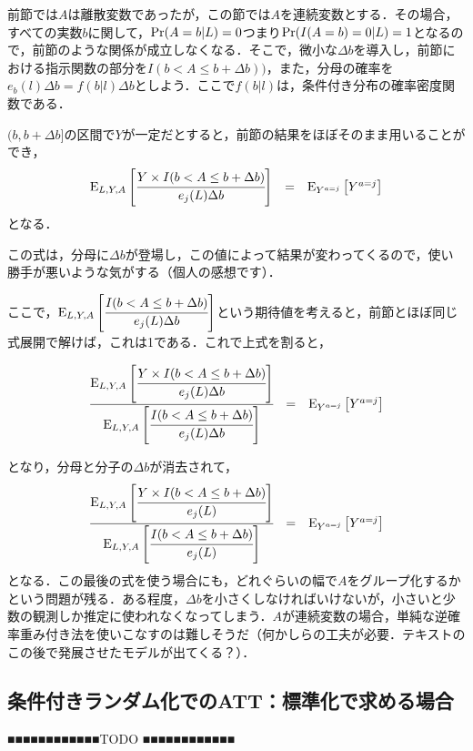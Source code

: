 \documentclass[12pt]{jsarticle}
\begin{document}
前節では$A$は離散変数であったが，この節では$A$を連続変数とする．その場合，すべての実数$b$に関して，${\rm Pr}(A=b|L) = 0$つまり${\rm Pr}(I(A=b)=0|L) = 1$となるので，前節のような関係が成立しなくなる．そこで，微小な$\Delta b$を導入し，前節における指示関数の部分を$I(b <A \le b + \Delta b))$，また，分母の確率を$e_b(l)\Delta b = f(b|l) \Delta b$としよう．ここで$f(b|l)$は，条件付き分布の確率密度関数である．

$(b, b+\Delta b]$の区間で$Y$が一定だとすると，前節の結果をほぼそのまま用いることができ，
\[
\begin{array}{lll}
{\rm E}_{L, Y, A} \left[ \cfrac{Y \times I(b<A\le b + \Delta b)}{e_j(L) \Delta b} \right]
&=& {\rm E}_{Y^{a=j}} \left[ Y^{a=j} \right]
\end{array}
\]
となる．

この式は，分母に$\Delta b$が登場し，この値によって結果が変わってくるので，使い勝手が悪いような気がする（個人の感想です）．


ここで，${\rm E}_{L, Y, A} \left[ \cfrac{I(b<A\le b + \Delta b)}{e_j(L) \Delta b} \right]$という期待値を考えると，前節とほぼ同じ式展開で解けば，これは1である．これで上式を割ると，

\[
\begin{array}{lll}
\cfrac{{\rm E}_{L, Y, A} \left[ \cfrac{Y \times I(b<A\le b + \Delta b)}{e_j(L) \Delta b} \right]}
{{\rm E}_{L, Y, A} \left[ \cfrac{I(b<A\le b + \Delta b)}{e_j(L) \Delta b} \right]}

&=& {\rm E}_{Y^{a=j}} \left[ Y^{a=j} \right]
\end{array}
\]

となり，分母と分子の$\Delta b$が消去されて，
\[
\begin{array}{lll}
\cfrac{{\rm E}_{L, Y, A} \left[ \cfrac{Y \times I(b<A\le b + \Delta b)}{e_j(L)} \right]}
{{\rm E}_{L, Y, A} \left[ \cfrac{I(b<A\le b + \Delta b)}{e_j(L)} \right]}

&=& {\rm E}_{Y^{a=j}} \left[ Y^{a=j} \right]
\end{array}
\]
となる．この最後の式を使う場合にも，どれぐらいの幅で$A$をグループ化するかという問題が残る．ある程度，$\Delta b$を小さくしなければいけないが，小さいと少数の観測しか推定に使われなくなってしまう．$A$が連続変数の場合，単純な逆確率重み付き法を使いこなすのは難しそうだ（何かしらの工夫が必要．テキストのこの後で発展させたモデルが出てくる？）．

\subsection{条件付きランダム化でのATT：標準化で求める場合}
■■■■■■■■■■■■TODO ■■■■■■■■■■■■
\end{document}
